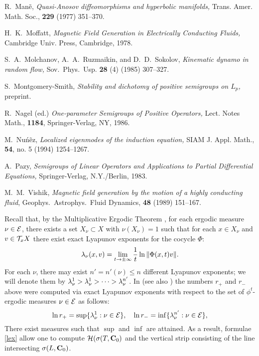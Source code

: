 \begin{thebibliography}{XXXX}
 R.~Man\~e,
{\em Quasi-Anosov diffeomorphisms and hyperbolic manifolds,}
Trans. Amer. Math. Soc., {\bf 229} (1977) 351--370.
 
 H.~K.~Moffatt,
{\em Magnetic Field Generation in
Electrically Conducting Fluids,} Cambridge Univ. Press, Cambridge,
1978.
 
 S.~A.~Molchanov, A.~A.~Ruzmaikin, and D.~D.~Sokolov,
{\em Kinematic dynamo in random flow,} Sov.~Phys.~Usp. {\bf 28} (4)
(1985) 307--327.

 S.~Montgomery-Smith,
{\em Stability and dichotomy of positive semigroups on $L_p$,}
preprint.

 R.~Nagel (ed.) {\em One-parameter Semigroups of
Positive Operators,}
Lect. Notes Math., {\bf 1184}, Springer-Verlag, NY, 1986.

 M.~Nu\'n\~ez, {\em Localized eigenmodes of the induction
equation,} SIAM J. Appl. Math., {\bf 54}, no. 5 (1994) 1254--1267.


% 
% 

 A.~Pazy,
{\em Semigroups of Linear Operators and Applications
to Partial Differential Equations,}
Springer-Verlag, N.Y./Berlin, 1983. 
 
 M.~M.~Vishik,
{\em Magnetic field generation by the motion of
a highly conducting fluid},
Geophys.~Astrophys.~Fluid Dynamics,
{\bf 48} (1989) 151--167.
 
\end{thebibliography}





Recall that, by the Multiplicative Ergodic Theorem \cite{OselMET}, 
for each ergodic measure $\nu\in{\cal{E}}$,
there exists a set $X_\nu \subset X$ with $\nu(X_\nu)=1$ such that
for each $x\in X_\nu$ and $v\in{\cal{T}}_xX$ 
there exist exact Lyapunov exponents for the cocycle $\Phi$:
\[\lambda_\nu(x,v)=\lim_{t\to\pm\infty}\frac1t\ln\|\Phi(x,t)v\|.\]
For each $\nu$, there may exist $n'=n'(\nu)\leq n$
different Lyapunov exponents; we will denote them by
$\lambda_\nu^1>\lambda_\nu^1>\dots>\lambda_\nu^{n'}$.
In \cite{LS} (see also \cite{Osel1}) the numbers $r_+$ and $r_-$ above 
were computed via exact Lyapunov exponents
 with respect to the set of $\phi^t$-ergodic
measures $\nu\in{\cal{E}}$ as follows:
\begin{equation}\lb{lex}
\ln r_+=\sup\{\lam_\nu^1: \nu\in\calE\},\quad
\ln r_-=\inf\{\lam_\nu^{n'}: \nu\in\calE\},
\end{equation}
There exist measures such that $\sup$ and $\inf$ are attained.
As a result, formulae \eqref{lex}  allow one to compute
${\cal{H}}(\sigma(T,{{\bold C}_0})$ and the vertical strip consisting
of the line intersecting $\sigma(L,{{\bold C}_0})$.

